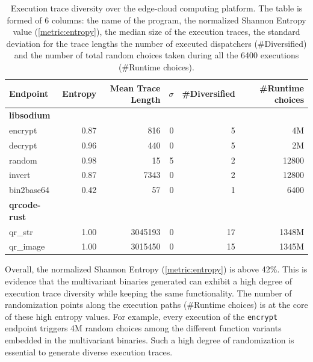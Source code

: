 {
\begin{table}
\small
\centering
\begin{tabular}{  p{1.9cm} |  r | r r | r r }

    Endpoint & Entropy & Mean Trace Length & $\sigma$ & \#Diversified & \#Runtime choices \\
    \hline
    \hline
    
    \textbf{libsodium}  \\
    \hline
    
encrypt & 0.87 & 816 & 0 & 5  & 4M\\

decrypt & 0.96  & 440 & 0 & 5 & 2M\\

random & 0.98 & 15 & 5 & 2 & 12800\\

invert & 0.87  & 7343 & 0 & 2 & 12800\\

bin2base64 & 0.42  & 57 & 0 & 1 & 6400\\

\hline
\textbf{qrcode-rust} \\
\hline
qr\_str & 1.00 & 3045193 & 0 & 17 & 1348M \\
qr\_image & 1.00  & 3015450 & 0 & 15 & 1345M\\
\hline

\end{tabular}
\caption{Execution trace diversity over the edge-cloud computing platform. The table is formed of 6 columns: the name of the program, the normalized Shannon Entropy value (\autoref{metric:entropy}), the median size of the execution traces, the standard deviation for the trace lengths the number of executed dispatchers (\#Diversified) and the number of total random choices taken during all the 6400 executions (\#Runtime choices).}\label{rq3:table:entropy}
\end{table}
}



Overall, the normalized Shannon Entropy (\autoref{metric:entropy}) is above 42\%. This is evidence that the multivariant binaries generated can exhibit a high degree of execution trace diversity while keeping the same functionality. The number of randomization points along the execution paths (\#Runtime choices) is at the core of these high entropy values. For example, every execution of the \texttt{encrypt} endpoint triggers 4M random choices among the different function variants embedded in the multivariant binaries. Such a high degree of randomization is essential to generate diverse execution traces. 


